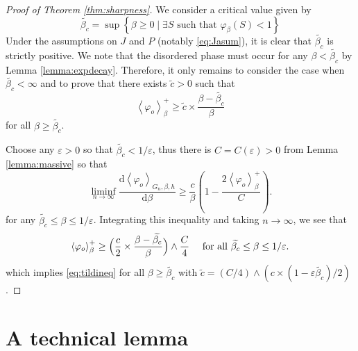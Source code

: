 \documentclass{article}
\numberwithin{equation}{section}
\theoremstyle{definition}
\theoremstyle{definition}
\theoremstyle{remark}
\renewcommand{\d}{\mathrm{d}}
\newcommand\vp{\varphi}
\renewcommand{\d}{\mathrm{d}}
\newcommand{\eps}{\varepsilon}
\begin{document}
\begin{proof}[Proof of Theorem \ref{thm:sharpness}]
	We consider a critical value given by
	\[
	\widetilde{\beta_c} = \sup \left\{  \beta \geq 0 \mid \exists S \text{ such that } \vp_\beta(S) < 1 \right\} 
	\] 
	Under the assumptions on $J$ and $P$ (notably \eqref{eq:Jasum}), it is clear that $ \widetilde{\beta_c}$ is strictly positive. We note that the disordered phase must occur for any $\beta < \widetilde{\beta_c}$ by Lemma \ref{lemma:expdecay}. Therefore, it only remains to consider the case when $ \widetilde{\beta_c} < \infty$ and to prove that there exists $ \widetilde{c} > 0$ such that
	\begin{equation}\label{eq:tildineq}
	\left< \vp_o \right>_{\beta}^{+} \geq \widetilde{c} \times \frac{\beta - \widetilde{\beta_c}}{\beta}
	\end{equation}
	for all $\beta \geq \widetilde{\beta_c}$. 
	
	Choose any $\eps > 0$ so that $ \widetilde{\beta_c} < 1/\eps$, thus there is $C = C(\eps) > 0$ from Lemma \ref{lemma:massive} so that
	\[
		\liminf_{n \to \infty} \frac{\d \left< \vp_o \right>_{G_n,\beta,h}}{\d \beta} \geq \frac{c}{\beta} \left( 1 - \frac{ 2\left< \vp_o \right>_{\beta}^+}{C}\right).
	\] 
	for any $ \widetilde{\beta_c} \leq \beta \leq 1 / \eps$. Integrating this inequality and taking $n \to \infty$, we see that 
	\[
		\left< \vp_o \right>_{\beta}^{+} \geq\Big ( \frac{c}{2} \times \frac{\beta - \widetilde{\beta_c}}{ \beta}\Big) \wedge \frac{C}{4} \quad \text{ for all $ \widetilde{\beta_c} \leq \beta \leq 1 / \eps.$} 
	\] 
	which implies \eqref{eq:tildineq} for all $\beta \geq \widetilde{\beta_c}$ with $\widetilde{c} = (C / 4) \wedge (c \times (1 - \eps \widetilde{\beta_c}) / 2)$.
\end{proof}
\section{A technical lemma}\label{sec:technical}
\end{document}
